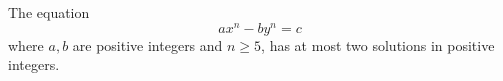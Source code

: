 \begin{proposition}
    The equation
\[
    ax^n-by^n=c
\]
    where $a,b$ are positive integers and $n\ge5$, has at most two solutions in positive integers.
\end{proposition}
